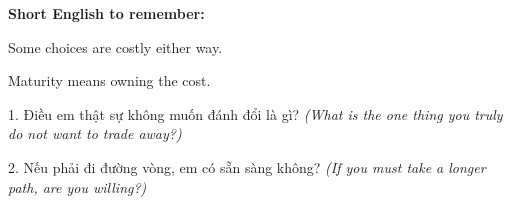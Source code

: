 \begin{ghinhoanh}
\textbf{Short English to remember:}

Some choices are costly either way.

Maturity means owning the cost.
\end{ghinhoanh}

\begin{tuhocnhanh}
1. Điều em thật sự không muốn đánh đổi là gì? \textit{(What is the one thing you truly do not want to trade away?)}

2. Nếu phải đi đường vòng, em có sẵn sàng không? \textit{(If you must take a longer path, are you willing?)}
\end{tuhocnhanh}
\ngancach